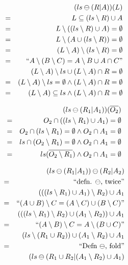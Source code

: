 \begin{eqnarray*}
  && (ls\ominus(R|A))(L)
\\&=& L \subseteq (ls \setminus R) \cup A
\\&=&  L \setminus ((ls \setminus R) \cup A) = \emptyset
\\&=&  L \setminus (A \cup (ls \setminus R)) = \emptyset
\\&=&  (L \setminus A) \setminus (ls \setminus R) = \emptyset
\\&=&\textrm{``$A\setminus(B\setminus C) = A\setminus B \cup A\cap C$''}
\\&&  (L \setminus A) \setminus ls
      \cup
     (L \setminus A) \cap R = \emptyset
\\&=&  (L \setminus A) \setminus ls = \emptyset
      \land
     (L \setminus A) \cap R = \emptyset
\\&=&  (L \setminus A) \subseteq ls
      \land
     (L \setminus A) \cap R = \emptyset
\end{eqnarray*}

\begin{eqnarray*}
  && (ls\ominus(R_1|A_1))(\overline{O_2})
\\&=& O_2 \cap ((ls \setminus R_1) \cup A_1) = \emptyset
\\&=& O_2 \cap (ls \setminus R_1)  = \emptyset
      \land
      O_2 \cap A_1 = \emptyset
\\&=& ls \cap (O_2 \setminus R_1)  = \emptyset
      \land
      O_2 \cap A_1 = \emptyset
\\&=& ls(\overline{O_2 \setminus R_1})
      \land
      O_2 \cap A_1 = \emptyset
\end{eqnarray*}

\begin{eqnarray*}
  && (ls\ominus(R_1|A_1))\ominus(R_2|A_2)
\\&=&\textrm{``defn. $\ominus$, twice''}
\\&& (((ls \setminus R_1) \cup A_1) \setminus R_2) \cup A_1
\\&=&\textrm{``$(A \cup B) \setminus C = (A\setminus C) \cup (B \setminus C)$''}
\\&& (((ls \setminus R_1)\setminus R_2) \cup (A_1\setminus R_2) )\cup A_1
\\&=&\textrm{``$(A \setminus B) \setminus C = A \setminus (B \cup C)$''}
\\&& (ls \setminus (R_1 \cup R_2)) \cup (A_1\setminus R_2) \cup A_1
\\&=&\textrm{``Defn $\ominus$, fold''}
\\&& (ls \ominus  (R_1 \cup R_2|(A_1\setminus R_2) \cup A_1)
\end{eqnarray*}

